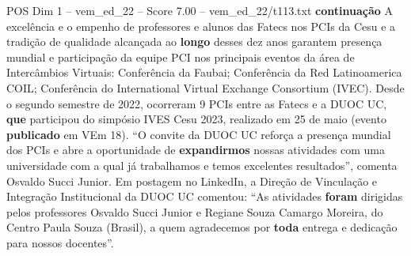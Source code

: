 \begin{textsample}{POS Dim 1 – vem\_ed\_22 – Score 7.00 – vem\_ed\_22/t113.txt}  \label{ex:f1_pos_173}
\textbf{continuação} A excelência e o empenho de professores e alunos das Fatecs nos PCIs da Cesu e a tradição de qualidade alcançada ao \textbf{longo} desses dez anos garantem presença mundial e participação da equipe PCI nos principais eventos da área de Intercâmbios Virtuais: Conferência da Faubai; Conferência da Red Latinoamerica COIL; Conferência do International Virtual Exchange Consortium (IVEC).
Desde o segundo semestre de 2022, ocorreram 9 PCIs entre as Fatecs e a DUOC UC, \textbf{que} participou do simpósio IVES Cesu 2023, realizado em 25 de maio (evento \textbf{publicado} em VEm 18). “O convite da DUOC UC reforça a presença mundial dos PCIs e abre a oportunidade de \textbf{expandirmos} nossas atividades com uma universidade com a qual já trabalhamos e temos excelentes resultados”, comenta Osvaldo Succi Junior.
Em postagem no LinkedIn, a Direção de Vinculação e Integração Institucional da DUOC UC comentou: “As atividades \textbf{foram} dirigidas pelos professores Osvaldo Succi Junior e Regiane Souza Camargo Moreira, do Centro Paula Souza (Brasil), a quem agradecemos por \textbf{toda} entrega e dedicação para nossos docentes”.

\end{textsample}
